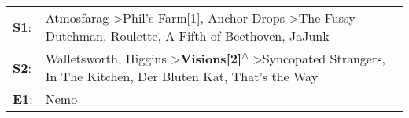 \begin{supertabular}{p{0.03\textwidth}p{0.92\textwidth}}
 \textbf{S1}:  &                      Atmosfarag\textsuperscript{} \textgreater \enspace Phil's Farm[1]\textsuperscript{}, \enspace Anchor Drops\textsuperscript{} \textgreater \enspace The Fussy Dutchman\textsuperscript{}, \enspace Roulette\textsuperscript{}, \enspace A Fifth of Beethoven\textsuperscript{}, \enspace JaJunk\textsuperscript{}  \enspace  \\
 \textbf{S2}:  &  Walletsworth\textsuperscript{}, \enspace Higgins\textsuperscript{} \textgreater \enspace \textbf{Visions[2]\textsuperscript{$\wedge$}} \textgreater \enspace Syncopated Strangers\textsuperscript{}, \enspace In The Kitchen\textsuperscript{}, \enspace Der Bluten Kat\textsuperscript{}, \enspace That's the Way\textsuperscript{}  \enspace  \\
 \textbf{E1}:  &                                                                                                                                                                                                                                                                                                                Nemo\textsuperscript{}  \enspace  \\
\end{supertabular}
